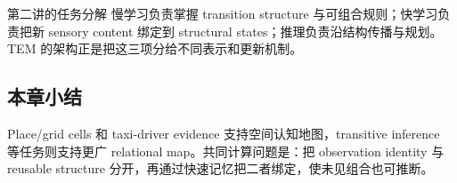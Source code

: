

\begin{importantbox}{第二讲的任务分解}
慢学习负责掌握 transition structure 与可组合规则；快学习负责把新 sensory content 绑定到 structural states；推理负责沿结构传播与规划。TEM 的架构正是把这三项分给不同表示和更新机制。
\end{importantbox}

\subsection{本章小结}

Place/grid cells 和 taxi-driver evidence 支持空间认知地图，transitive inference 等任务则支持更广 relational map。共同计算问题是：把 observation identity 与 reusable structure 分开，再通过快速记忆把二者绑定，使未见组合也可推断。

